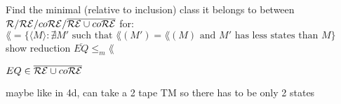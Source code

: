 Find the minimal (relative to inclusion) class it belongs to between $\mathcal{R}/\mathcal{R}\mathcal{E}/co\mathcal{R}\mathcal{E}/\overline{\mathcal{R}\mathcal{E} \cup co\mathcal{R}\mathcal{E}}$ for: \\
$\lang = \{\langle M \rangle : \nexists M' \text{ such that } \lang(M')=\lang(M) \text{ and } M' \text{ has less states than } M\}$  \\

show reduction $\overline{EQ} \leq_m \lang$

$EQ \in \overline{\mathcal{R}\mathcal{E} \cup co\mathcal{R}\mathcal{E}}$

maybe like in 4d, can take a 2 tape TM so there has to be only 2 states
